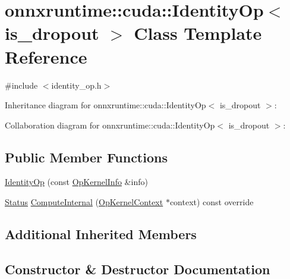 \hypertarget{classonnxruntime_1_1cuda_1_1IdentityOp}{}\section{onnxruntime\+:\+:cuda\+:\+:Identity\+Op$<$ is\+\_\+dropout $>$ Class Template Reference}
\label{classonnxruntime_1_1cuda_1_1IdentityOp}


{\ttfamily \#include $<$identity\+\_\+op.\+h$>$}



Inheritance diagram for onnxruntime\+:\+:cuda\+:\+:Identity\+Op$<$ is\+\_\+dropout $>$\+:


Collaboration diagram for onnxruntime\+:\+:cuda\+:\+:Identity\+Op$<$ is\+\_\+dropout $>$\+:
\subsection*{Public Member Functions}
\begin{DoxyCompactItemize}
\item 
\mbox{\hyperlink{classonnxruntime_1_1cuda_1_1IdentityOp_a5a30304fe0fa216d4be3a4cb344372a1}{Identity\+Op}} (const \mbox{\hyperlink{classonnxruntime_1_1OpKernelInfo}{Op\+Kernel\+Info}} \&info)
\item 
\mbox{\hyperlink{classonnxruntime_1_1common_1_1Status}{Status}} \mbox{\hyperlink{classonnxruntime_1_1cuda_1_1IdentityOp_aebedebb3ee26d00443c2c6d8b6f8e3c3}{Compute\+Internal}} (\mbox{\hyperlink{classonnxruntime_1_1OpKernelContext}{Op\+Kernel\+Context}} $\ast$context) const override
\end{DoxyCompactItemize}
\subsection*{Additional Inherited Members}


\subsection{Constructor \& Destructor Documentation}
\mbox{\label{classonnxruntime_1_1cuda_1_1IdentityOp_a5a30304fe0fa216d4be3a4cb344372a1}} 
